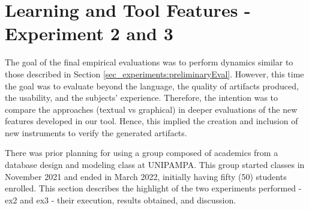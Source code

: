 \section{Learning and Tool Features - Experiment 2 and 3}
\label{sec_experiments:finalEval}

The goal of the final empirical evaluations was to perform dynamics similar to those described in Section \ref{sec_experiments:preliminaryEval}.
However, this time the goal was to evaluate beyond the language, the quality of artifacts produced, the usability, and the subjects' experience.
Therefore, the intention was to compare the approaches (textual vs graphical) in deeper evaluations of the new features developed in our tool.
Hence, this implied the creation and inclusion of new instruments to verify the generated artifacts.

There was prior planning for using a group composed of academics from a database design and modeling class at UNIPAMPA.
This group started classes in November 2021 and ended in March 2022, initially having fifty (50) students enrolled.
This section describes the highlight of the two experiments performed - \ac{ex2} and \ac{ex3} - their execution, results obtained, and discussion.

